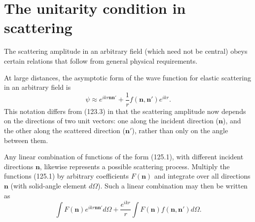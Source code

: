 \section{The unitarity condition in scattering}

The scattering amplitude in an arbitrary field (which need not be central)
obeys certain relations that follow from general physical requirements.

At large distances, the asymptotic form of the wave function for elastic
scattering in an arbitrary field is
\begin{equation}
 \psi\approx e^{ikr\mathbf n\mathbf n'}+\frac1r
 f(\mathbf n,\mathbf n')e^{ikr}.
 \tag{125.1}
\end{equation}
This notation differs from (123.3) in that the scattering amplitude now
depends on the directions of two unit vectors: one along the incident
direction ($\mathbf n$), and the other along the scattered direction
($\mathbf n'$), rather than only on the angle between them.

Any linear combination of functions of the form (125.1), with different
incident directions $\mathbf n$, likewise represents a possible scattering
process. Multiply the functions (125.1) by arbitrary coefficients
$F(\mathbf n)$ and integrate over all directions $\mathbf n$ (with solid-angle
element $d\Omega$). Such a linear combination may then be written as
\begin{equation}
 \int F(\mathbf n)e^{ikr\mathbf n\mathbf n'}d\Omega
 +\frac{e^{ikr}}r\int F(\mathbf n)f(\mathbf n,\mathbf n')d\Omega.
 \tag{125.2}
\end{equation}

